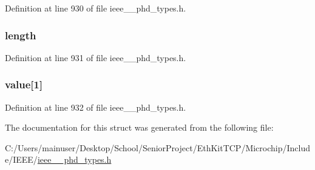 Definition at line 930 of file ieee\+\_\+\_\+phd\+\_\+types.\+h.

\hypertarget{struct___scan_report_per_fixed_list_a3743679e4ff85e3e1b3fc2e59973fbb3}{}
\subsubsection[{length}]{ length}\label{struct___scan_report_per_fixed_list_a3743679e4ff85e3e1b3fc2e59973fbb3}


Definition at line 931 of file ieee\+\_\+\_\+phd\+\_\+types.\+h.

\hypertarget{struct___scan_report_per_fixed_list_a322e630133960b939b9d08fec42a75b3}{}
\subsubsection[{value}]{ value\mbox{[}1\mbox{]}}\label{struct___scan_report_per_fixed_list_a322e630133960b939b9d08fec42a75b3}


Definition at line 932 of file ieee\+\_\+\_\+phd\+\_\+types.\+h.



The documentation for this struct was generated from the following file\+:\begin{DoxyCompactItemize}
\item 
C\+:/\+Users/mainuser/\+Desktop/\+School/\+Senior\+Project/\+Eth\+Kit\+T\+C\+P/\+Microchip/\+Include/\+I\+E\+E\+E/\hyperlink{ieee__11073__phd__types_8h}{ieee\+\_\+\_\+phd\+\_\+types.\+h}\end{DoxyCompactItemize}
